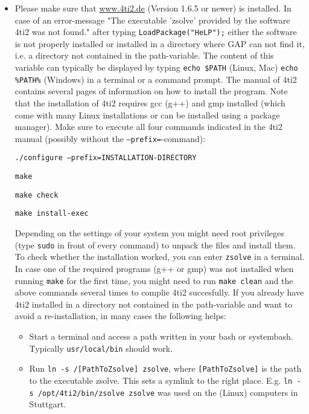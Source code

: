 \documentclass[a4paper,11pt]{report}
\begin{document}
{{\begin{itemize}
 
\item  Please make sure that \href{http://www.4ti2.de} {www.4ti2.de} (Version 1.6.5 or newer) is installed. In case of an error-message "The
executable 'zsolve' provided by the software 4ti2 was not found." after typing \texttt{LoadPackage("HeLP");} either the software is not properly installed or installed in a directory
where GAP can not find it, i.e. a directory not contained in the
path-variable. The content of this variable can typically be displayed by
typing \texttt{echo \$PATH} (Linux, Mac) \texttt{echo \%PATH\%} (Windows) in a terminal or a command prompt. The manual of 4ti2 contains
several pages of information on how to install the program. Note that the
installation of 4ti2 requires gcc (g++) and gmp installed (which come with
many Linux installations or can be installed using a package manager). Make
sure to execute all four commands indicated in the 4ti2 manual (possibly
without the \texttt{--prefix=}-command):

 \texttt{./configure --prefix=INSTALLATION-DIRECTORY}

 \texttt{make}

 \texttt{make check}

 \texttt{make install-exec}

 Depending on the settings of your system you might need root privileges (type \texttt{sudo} in front of every command) to unpack the files and install them. To check
whether the installation worked, you can enter \texttt{zsolve} in a terminal. In case one of the required programs (g++ or gmp) was not
installed when running \texttt{make} for the first time, you might need to run \texttt{make clean} and the above commands several times to complie 4ti2 succesfully. If you
already have 4ti2 installed in a directory not contained in the path-variable
and want to avoid a re-installation, in many cases the following helps: 
\begin{itemize}
\item  Start a terminal and access a path written in your bash or
system{\textunderscore}bash. Typically \texttt{usr/local/bin} should work. 

 
\item  Run \texttt{ln -s /[PathToZsolve] zsolve}, where \texttt{[PathToZsolve]} is the path to the executable zsolve. This sets a symlink to the right place.
E.g. \texttt{ln -s /opt/4ti2/bin/zsolve zsolve} was used on the (Linux) computers in Stuttgart. 
\end{itemize}
 

\end{itemize}}}
\end{document}
